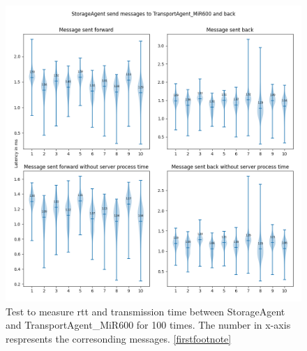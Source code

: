 \begin{figure}[p]
    \includegraphics[width=\textwidth]{figures/appendix/usecase/violin_StorageAgent_to_TransportAgent_MiR600.png}
    \centering
    \caption{Test to measure \gls{rtt} and transmission time between StorageAgent and 
    TransportAgent\_MiR600 for 100 times. The number in x-axis respresents the 
    corresonding messages. \protect\ref{firstfootnote}}
    \label{fig: violin-ST-T600}
\end{figure}

